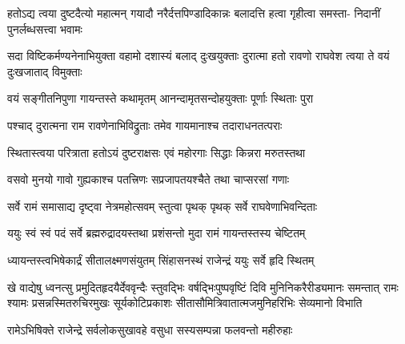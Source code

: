 \begin{minipage}{\linewidth}
\centering
{}

\fourlineindentedshloka
{हतोऽद्य त्वया दुष्टदैत्यो महात्मन्}
{गयादौ नरैर्दत्तपिण्डादिकान्नः}
{बलादत्ति हत्वा गृहीत्वा समस्ता-}
{निदानीं पुनर्लब्धसत्त्वा भवामः} %
\end{minipage}

\begin{minipage}{\linewidth}
\centering
{}

\fourlineindentedshloka
{सदा विष्टिकर्मण्यनेनाभियुक्ता}
{वहामो दशास्यं बलाद् दुःखयुक्ताः}
{दुरात्मा हतो रावणो राघवेश}
{त्वया ते वयं दुःखजाताद् विमुक्ताः} %
\end{minipage}

\begin{minipage}{\linewidth}
\centering
{}

\twolineshloka
{वयं सङ्गीतनिपुणा गायन्तस्ते कथामृतम्}
{आनन्दामृतसन्दोहयुक्ताः पूर्णाः स्थिताः पुरा} %
\end{minipage}

\twolineshloka
{पश्चाद् दुरात्मना राम रावणेनाभिविद्रुताः}
{तमेव गायमानाश्च तदाराधनतत्पराः} %

\twolineshloka
{स्थितास्त्वया परित्राता हतोऽयं दुष्टराक्षसः}
{एवं महोरगाः सिद्धाः किन्नरा मरुतस्तथा} %

\twolineshloka
{वसवो मुनयो गावो गुह्यकाश्च पतत्त्रिणः}
{सप्रजापतयश्चैते तथा चाप्सरसां गणाः} %

\twolineshloka
{सर्वे रामं समासाद्य दृष्ट्वा नेत्रमहोत्सवम्}
{स्तुत्वा पृथक् पृथक् सर्वे राघवेणाभिवन्दिताः} %

\twolineshloka
{ययुः स्वं स्वं पदं सर्वे ब्रह्मरुद्रादयस्तथा}
{प्रशंसन्तो मुदा रामं गायन्तस्तस्य चेष्टितम्} %

\twolineshloka
{ध्यायन्तस्त्वभिषेकार्द्रं सीतालक्ष्मणसंयुतम्}
{सिंहासनस्थं राजेन्द्रं ययुः सर्वे हृदि स्थितम्} %

\fourlineindentedshloka
{खे वाद्येषु ध्वनत्सु प्रमुदितहृदयैर्देववृन्दैः स्तुवद्भिः}
{वर्षद्भिःपुष्पवृष्टिं दिवि मुनिनिकरैरीड्यमानः समन्तात्}
{रामः श्यामः प्रसन्नस्मितरुचिरमुखः सूर्यकोटिप्रकाशः}
{सीतासौमित्रिवातात्मजमुनिहरिभिः सेव्यमानो विभाति} %






\twolineshloka
{रामेऽभिषिक्ते राजेन्द्रे सर्वलोकसुखावहे}
{वसुधा सस्यसम्पन्ना फलवन्तो महीरुहाः} %

